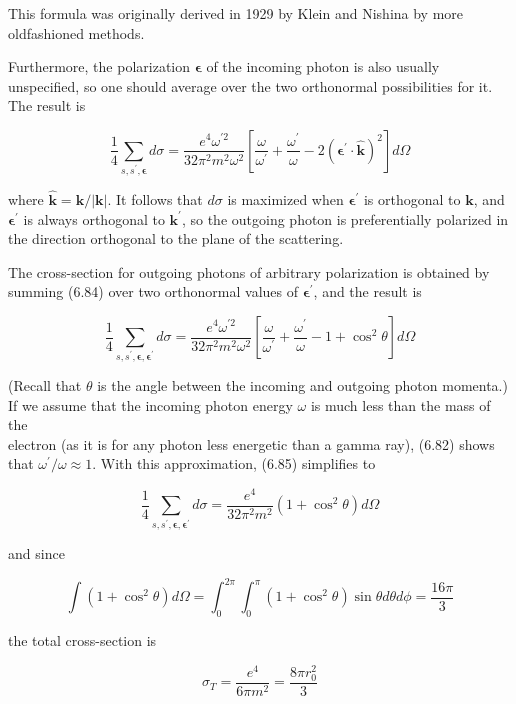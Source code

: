 \documentclass[10pt, letterpaper]{article}
\begin{document}
This formula was originally derived in 1929 by Klein and Nishina by more oldfashioned methods.

Furthermore, the polarization $\boldsymbol{\epsilon}$ of the incoming photon is also usually unspecified, so one should average over the two orthonormal possibilities for it. The result is

$$
\frac{1}{4} \sum_{s, s^{\prime}, \boldsymbol{\epsilon}} d \sigma=\frac{e^{4} \omega^{\prime 2}}{32 \pi^{2} m^{2} \omega^{2}}\left[\frac{\omega}{\omega^{\prime}}+\frac{\omega^{\prime}}{\omega}-2\left(\boldsymbol{\epsilon}^{\prime} \cdot \widehat{\mathbf{k}}\right)^{2}\right] d \Omega
$$

where $\widehat{\mathbf{k}}=\mathbf{k} /|\mathbf{k}|$. It follows that $d \sigma$ is maximized when $\boldsymbol{\epsilon}^{\prime}$ is orthogonal to $\mathbf{k}$, and $\boldsymbol{\epsilon}^{\prime}$ is always orthogonal to $\mathbf{k}^{\prime}$, so the outgoing photon is preferentially polarized in the direction orthogonal to the plane of the scattering.

The cross-section for outgoing photons of arbitrary polarization is obtained by summing (6.84) over two orthonormal values of $\boldsymbol{\epsilon}^{\prime}$, and the result is

$$
\frac{1}{4} \sum_{s, s^{\prime}, \boldsymbol{\epsilon}, \boldsymbol{\epsilon}^{\prime}} d \sigma=\frac{e^{4} \omega^{\prime 2}}{32 \pi^{2} m^{2} \omega^{2}}\left[\frac{\omega}{\omega^{\prime}}+\frac{\omega^{\prime}}{\omega}-1+\cos ^{2} \theta\right] d \Omega
$$

(Recall that $\theta$ is the angle between the incoming and outgoing photon momenta.) If we assume that the incoming photon energy $\omega$ is much less than the mass of the\\
electron (as it is for any photon less energetic than a gamma ray), (6.82) shows that $\omega^{\prime} / \omega \approx 1$. With this approximation, (6.85) simplifies to

$$
\frac{1}{4} \sum_{s, s^{\prime}, \boldsymbol{\epsilon}, \boldsymbol{\epsilon}^{\prime}} d \sigma=\frac{e^{4}}{32 \pi^{2} m^{2}}\left(1+\cos ^{2} \theta\right) d \Omega
$$

and since

$$
\int\left(1+\cos ^{2} \theta\right) d \Omega=\int_{0}^{2 \pi} \int_{0}^{\pi}\left(1+\cos ^{2} \theta\right) \sin \theta d \theta d \phi=\frac{16 \pi}{3}
$$

the total cross-section is

$$
\sigma_{T}=\frac{e^{4}}{6 \pi m^{2}}=\frac{8 \pi r_{0}^{2}}{3}
$$
\end{document}
